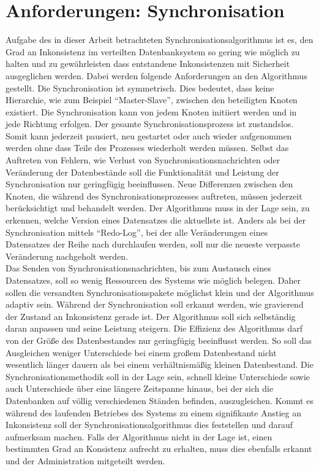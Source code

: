 \documentclass[a4paper,11pt,oneside,%
headsepline,												%
footsepline,												%
bibtotocnumbered									%
]{scrreprt}
\begin{document}
\section{Anforderungen: Synchronisation}
Aufgabe des in dieser Arbeit betrachteten Synchronisationsalgorithmus ist es, den Grad an Inkonsistenz im verteilten Datenbanksystem so gering wie möglich zu halten und zu gewährleisten dass entstandene Inkonsistenzen mit Sicherheit ausgeglichen werden. Dabei werden folgende Anforderungen an den Algorithmus gestellt. Die Synchronisation ist symmetrisch. Dies bedeutet, dass keine Hierarchie, wie zum Beispiel \enquote{Master-Slave}, zwischen den beteiligten Knoten existiert. Die Synchronisation kann von jedem Knoten initiiert werden und in jede Richtung erfolgen. Der gesamte Synchronisationsprozess ist zustandslos. Somit kann jederzeit pausiert, neu gestartet oder auch wieder aufgenommen werden ohne dass Teile des Prozesses wiederholt werden müssen. Selbst das Auftreten von Fehlern, wie Verlust von Synchronisationsnachrichten oder Veränderung der Datenbestände soll die Funktionalität und Leistung der Synchronisation nur geringfügig beeinflussen. Neue Differenzen zwischen den Knoten, die während des Synchronisationsprozesses auftreten, müssen jederzeit berücksichtigt und behandelt werden. Der Algorithmus muss in der Lage sein, zu erkennen, welche Version eines Datensatzes die aktuellste ist. Anders als bei der Synchronisation mittels \enquote{Redo-Log}, bei der alle Veränderungen eines Datensatzes der Reihe nach durchlaufen werden, soll nur die neueste verpasste Veränderung nachgeholt werden.\\

Das Senden von Synchronisationsnachrichten, bis zum Austausch eines Datensatzes, soll so wenig Ressourcen des Systems wie möglich belegen. Daher sollen die versandten Synchronisationspakete möglichst klein und der Algorithmus adaptiv sein. Während der Synchronisation soll erkannt werden, wie gravierend der Zustand an Inkonsistenz gerade ist. Der Algorithmus soll sich selbständig daran anpassen und seine Leistung steigern. Die Effizienz des Algorithmus darf von der Größe des Datenbestandes nur geringfügig beeinflusst werden. So soll das Ausgleichen weniger Unterschiede bei einem großem Datenbestand nicht wesentlich länger dauern als bei einem verhältnismäßig kleinen Datenbestand. Die Synchronisationsmethodik soll in der Lage sein, schnell kleine Unterschiede sowie auch Unterschiede über eine längere Zeitspanne hinaus, bei der sich die Datenbanken auf völlig verschiedenen Ständen befinden, auszugleichen. Kommt es während des laufenden Betriebes des Systems zu einem signifikante Anstieg an Inkonsistenz soll der Synchronisationsalgorithmus dies feststellen und darauf aufmerksam machen. Falls der Algorithmus nicht in der Lage ist, einen bestimmten Grad an Konsistenz aufrecht zu erhalten, muss dies ebenfalls erkannt und der Administration mitgeteilt werden.
\end{document}
